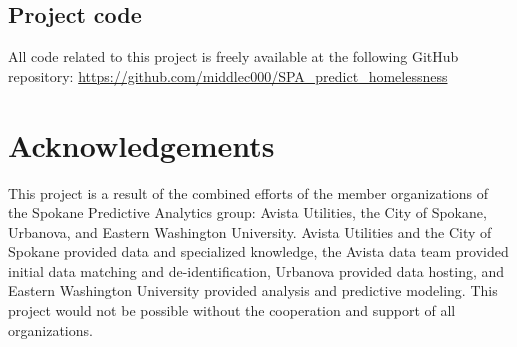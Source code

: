 \documentclass[10pt,letterpaper]{article}
\begin{document}
\subsection*{Project code}
All code related to this project is freely available at the following GitHub repository:  
\url{https://github.com/middlec000/SPA_predict_homelessness}

\section*{Acknowledgements}
This project is a result of the combined efforts of the member organizations of the Spokane Predictive Analytics group: Avista Utilities, the City of Spokane, Urbanova, and Eastern Washington University. Avista Utilities and the City of Spokane provided data and specialized knowledge, the Avista data team provided initial data matching and de-identification, Urbanova provided data hosting, and Eastern Washington University provided analysis and predictive modeling. This project would not be possible without the cooperation and support of all organizations.

\nolinenumbers

%
%
% 




\end{document}
